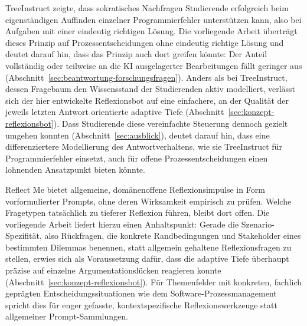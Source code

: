 TreeInstruct \cite{karguptaInstructNotAssist2024} zeigte, dass sokratisches Nachfragen Studierende
erfolgreich beim eigenständigen Auffinden einzelner Programmierfehler unterstützen kann, also bei
Aufgaben mit einer eindeutig richtigen Lösung. Die vorliegende Arbeit überträgt dieses Prinzip auf
Prozessentscheidungen ohne eindeutig richtige Lösung und deutet darauf hin, dass das Prinzip auch dort
greifen könnte: Der Anteil vollständig oder teilweise an die KI ausgelagerter Bearbeitungen fällt
geringer aus (Abschnitt~\ref{sec:beantwortung-forschungsfragen}). Anders als bei TreeInstruct, dessen
Fragebaum den Wissensstand der Studierenden aktiv modelliert, verlässt sich der hier entwickelte
Reflexionsbot auf eine einfachere, an der Qualität der jeweils letzten Antwort orientierte adaptive
Tiefe (Abschnitt~\ref{sec:konzept-reflexionsbot}). Dass Studierende diese vereinfachte Steuerung
dennoch gezielt umgehen konnten (Abschnitt~\ref{sec:ausblick}), deutet darauf hin, dass eine
differenziertere Modellierung des Antwortverhaltens, wie sie TreeInstruct für Programmierfehler
einsetzt, auch für offene Prozessentscheidungen einen lohnenden Ansatzpunkt bieten könnte.

\glqq Reflect Me\grqq{} \cite{mollerReflectMeTextgenerative2025} bietet allgemeine, domänenoffene
Reflexionsimpulse in Form vorformulierter Prompts, ohne deren Wirksamkeit empirisch zu prüfen. Welche
Fragetypen tatsächlich zu tieferer Reflexion führen, bleibt dort offen. Die vorliegende Arbeit
liefert hierzu einen Anhaltspunkt:
Gerade die Szenario-Spezifität, also Rückfragen, die konkrete Randbedingungen und Stakeholder eines
bestimmten Dilemmas benennen, statt allgemein gehaltene Reflexionsfragen zu stellen, erwies sich als
Voraussetzung dafür, dass die adaptive Tiefe überhaupt präzise auf einzelne Argumentationslücken
reagieren konnte (Abschnitt~\ref{sec:konzept-reflexionsbot}). Für Themenfelder mit konkreten,
fachlich geprägten Entscheidungssituationen wie dem Software-Prozessmanagement spricht dies für enger
gefasste, kontextspezifische Reflexionswerkzeuge statt allgemeiner Prompt-Sammlungen.

